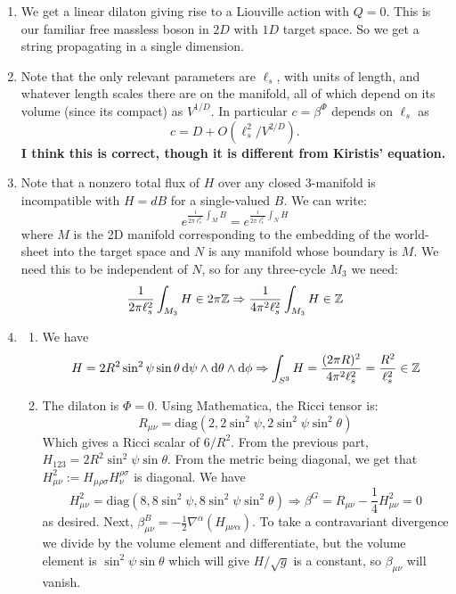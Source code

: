 \documentclass[11pt, class=article, crop=false]{standalone}
\begin{document}
\begin{enumerate}
	
	\item We get a linear dilaton giving rise to a Liouville action with $Q = 0$. This is our familiar free massless boson in $2D$ with $1D$ target space. So we get a string propagating in a single dimension.
	
	\item Note that the only relevant parameters are $\ell_s$, with units of length, and whatever length scales there are on the manifold, all of which depend on its volume (since its compact) as $V^{1/D}$. In particular $c = \beta^\Phi$ depends on $\ell_s$ as 
	\[
		c = D + O(\ell_s^2/V^{2/D}).
	\]
	\textbf{I think this is correct, though it is different from Kiristis' equation.}
	
	\item Note that a nonzero total flux of $H$ over any closed 3-manifold is incompatible with $H = dB$ for a single-valued $B$. We can write:
	\[
		e^{\frac{i}{2 \pi \ell_s^2} \int_{M} B } = e^{\frac{i}{2 \pi \ell_s^2} \int_{N} H }
	\]
	where $M$ is the 2D manifold corresponding to the embedding of the world-sheet into the target space and $N$ is any manifold whose boundary is $M$. We need this to be independent of $N$, so for any three-cycle $M_3$ we need:
	\[
		\frac{1}{2 \pi \ell_s^2} \int_{M_3} H \in 2 \pi \mathbb{Z} \Rightarrow \frac{1}{4\pi^2 \ell_s^2} \int_{M_3} H \in \mathbb{Z}
	\]
	\newpage
	\item 
	\begin{enumerate}
		\item We have
		\[
			H = 2 R^2 \sin^2 \psi \sin \theta \, \mathrm{d}\psi \wedge \mathrm{d} \theta \wedge \mathrm{d} \phi \Rightarrow \int_{S^3} H = \frac{(2\pi R)^2}{4 \pi^2 \ell_s^2} = \frac{R^2}{\ell_s^2} \in \mathbb{Z}
		\]
		\item 
		The dilaton is $\Phi = 0$.  Using Mathematica, the Ricci tensor is:
		\[
			R_{\mu \nu} =  \mathrm{diag}(2, 2 \sin^2 \psi, 2 \sin^2 \psi \sin^2 \theta )
		\]
		Which gives a Ricci scalar of $6/R^2$.
		From the previous part, $H_{123} = 2 R^2 \sin^2 \psi \sin \theta$. From the metric being diagonal, we get that $H^2_{\mu \nu} := H_{\mu \rho \sigma} H_{\nu}^{\rho \sigma}$ is diagonal. We have
		\[
			H^2_{\mu \nu} = \mathrm{diag}(8, 8 \sin^2 \psi, 8 \sin^2 \psi \sin^2 \theta) \Rightarrow \beta^G = R_{\mu \nu} - \frac14 H^2_{\mu \nu} = 0
		\]
		as desired. Next, $\beta^B_{\mu \nu} = -\frac12 \nabla^\alpha (H_{\mu \nu \alpha})$. To take a contravariant divergence we divide by the volume element and differentiate, but the volume element is $\sin^2 \psi \sin \theta$ which will give $H/\sqrt g$ is a constant, so $\beta_{\mu \nu}$ will vanish. 
		

\end{enumerate}
\end{enumerate}
\end{document}

